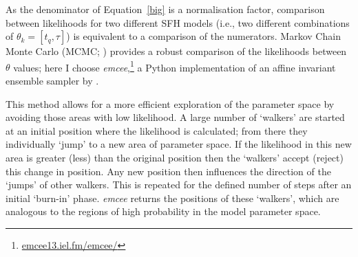 \begin{figure}
\label{one_example}
\end{figure}

As the denominator of Equation~\ref{big} is a normalisation factor, comparison between likelihoods for two different SFH models (i.e., two different combinations of $\theta_k = [t_q, \tau]$) is equivalent to a comparison of the numerators. Markov Chain Monte Carlo (MCMC; \citealt{mackay03, emcee13, GW10}) provides a robust comparison of the likelihoods between $\theta$ values; here I choose \emph{emcee},\footnote{\url{emcee13.iel.fm/emcee/}} a Python implementation of an affine invariant ensemble sampler by \cite{emcee13}.

This method allows for a more efficient exploration of the parameter space by avoiding those areas with low likelihood. A large number of `walkers' are started at an initial position where the likelihood is calculated; from there they individually `jump' to a new area of parameter space. If the likelihood in this new area is greater (less) than the original position then the `walkers' accept (reject) this change in position. Any new position then influences the direction of the  `jumps' of other walkers. This is repeated for the defined number of steps after an initial `burn-in' phase. \emph{emcee} returns the positions of these `walkers', which are analogous to the regions of high probability in the model parameter space. 

